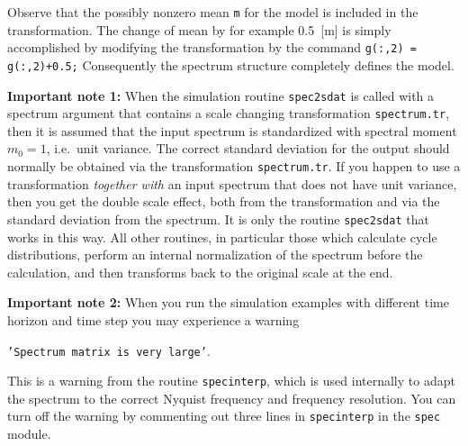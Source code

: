 Observe that the possibly nonzero mean {\tt m} for the model is
included in the transformation. The change of mean by for example 0.5~[m]
is simply accomplished by modifying the transformation 
by the command {\tt g(:,2) = g(:,2)+0.5;}
Consequently the spectrum structure completely defines the model.

\bigskip
\noindent
{\bf\sc Important note 1:} \label{ImpNote_1} When the simulation routine \verb+spec2sdat+
is called with a spectrum argument that contains a scale changing
transformation \verb+spectrum.tr+, then it is
assumed that the input spectrum is standardized
with spectral moment $m_0=1$, i.e.\ unit variance. The correct
standard deviation
for the output should normally be  obtained via the transformation
\verb+spectrum.tr+. If you happen to use a transformation
{\it together with} an input spectrum that does not have unit
variance, then you get the double scale effect, both from the
transformation and via
the standard deviation from the spectrum. It is only the routine
\verb+spec2sdat+ that works in this way. All other routines, in
particular those which calculate cycle distributions, perform an
internal normalization of the spectrum before the calculation, and
then transforms back to the original scale at the end.

\bigskip
\noindent
{\bf\sc Important note 2:} When you run the simulation examples 
with different time horizon and time step you may experience a
warning

\centerline{
 {\tt 'Spectrum matrix is very large'}.
 }
 
 \noindent
This is a warning from the \wf{} routine {\tt specinterp}, which is used 
internally to adapt the spectrum to the correct Nyquist frequency 
and frequency resolution. You can turn off the warning by commenting 
out three lines in {\tt specinterp} in the {\tt spec} 
module.

